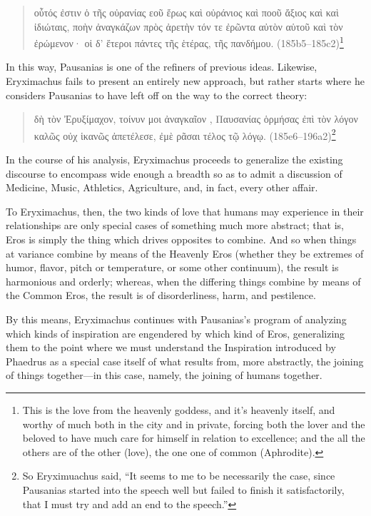 \begin{quote}
\textgreek{οὗτός ἐστιν ὁ τῆς οὐρανίας εοῦ ἔρως καὶ οὐράνιος
καὶ ποοῦ ἄξιος καὶ  καὶ ἰδιώταις, ποὴν
 ἀναγκάζων  πρὸς ἀρετὴν τόν τε
ἐρῶντα αὐτὸν αὑτοῦ καὶ τὸν ἐρώμενον· οἱ δ' ἕτεροι πάντες τῆς ἑτέρας,
τῆς πανδήμου.} (185b5--185c2)\footnote{This is the love from the
heavenly goddess, and it's heavenly itself, and worthy of much both in
the city and in private, forcing both the lover and the beloved to
have much care for himself in relation to excellence; and the all the
others are of the other (love), the one one of common (Aphrodite).}
\end{quote}

In this way, Pausanias is one of the refiners of previous ideas.
Likewise, Eryximachus fails to present an entirely new approach, but
rather starts where he considers Pausanias to have left off on the way
to the correct theory:

\begin{quote}
\textgreek{ δὴ τὸν Ἐρυξίμαχον,  τοίνυν μοι
ἀναγκαῖον ,  Παυσανίας ὁρμήσας ἐπὶ τὸν λόγον
καλῶς οὐχ ἱκανῶς ἀπετέλεσε,  ἐμὲ ρᾶσαι τέλος
 τῷ λόγῳ.} (185e6--196a2)\footnote{So
Eryximuachus said, ``It seems to me to be necessarily the case, since
Pausanias started into the speech well but failed to finish it
satisfactorily, that I must try and add an end to the speech.''}
\end{quote}

In the course of his analysis, Eryximachus proceeds to generalize the
existing discourse to encompass wide enough a breadth so as to admit a
discussion of Medicine, Music, Athletics, Agriculture, and, in fact,
every other affair.

To Eryximachus, then, the two kinds of love that humans may experience
in their relationships are only special cases of something much more
abstract; that is, Eros is simply the thing which drives opposites to
combine. And so when things at variance combine by means of the Heavenly
Eros (whether they be extremes of humor, flavor, pitch or temperature,
or some other continuum), the result is harmonious and orderly; whereas,
when the differing things combine by means of the Common Eros, the
result is of disorderliness, harm, and pestilence.

By this means, Eryximachus continues with Pausanias's program of
analyzing which kinds of inspiration are engendered by which kind of
Eros, generalizing them to the point where we must understand the
Inspiration introduced by Phaedrus as a special case itself of what
results from, more abstractly, the joining of things together---in this
case, namely, the joining of humans together.

